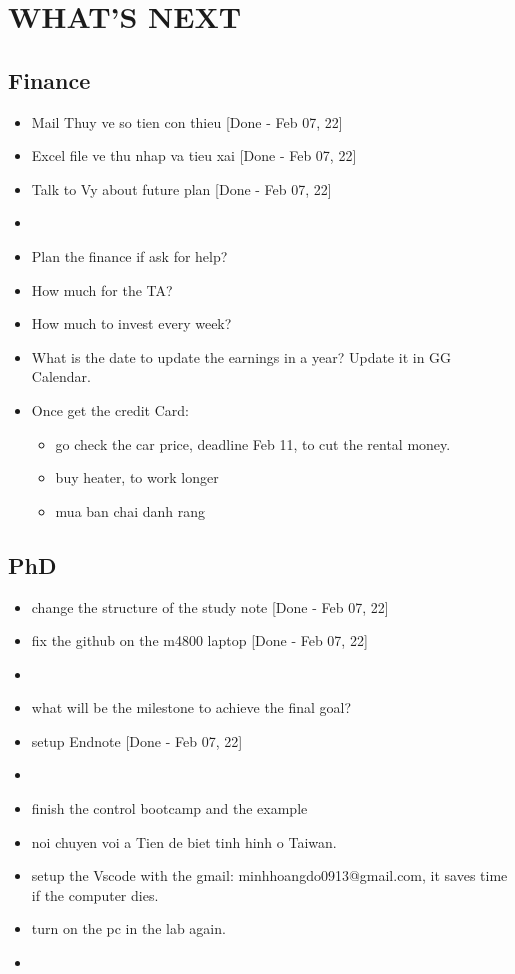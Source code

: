 \section{WHAT'S NEXT}

\subsection{Finance}
\begin{itemize}
    \item Mail Thuy ve so tien con thieu [Done - Feb 07, 22]
    \item Excel file ve thu nhap va tieu xai [Done - Feb 07, 22]
    \item Talk to Vy about future plan [Done - Feb 07, 22]
    \item 
    \item Plan the finance if ask for help?
    \item How much for the TA?
    \item How much to invest every week?
    \item What is the date to update the earnings in a year? Update it in GG Calendar.
    \item Once get the credit Card:
        \begin{itemize}
            \item go check the car price, deadline Feb 11, to cut the rental money.
            \item buy heater, to work longer
            \item mua ban chai danh rang
        \end{itemize}
\end{itemize}

\subsection{PhD}
\begin{itemize}
    \item change the structure of the study note [Done - Feb 07, 22]
    \item fix the github on the m4800 laptop [Done - Feb 07, 22]
    \item 
    \item what will be the milestone to achieve the final goal?
    \item setup Endnote [Done - Feb 07, 22]
    \item 
    \item finish the control bootcamp and the example
    \item noi chuyen voi a Tien de biet tinh hinh o Taiwan.
    \item setup the Vscode with the gmail: minhhoangdo0913@gmail.com, it saves time if the computer dies.
    \item turn on the pc in the lab again.
    \item 
\end{itemize}

